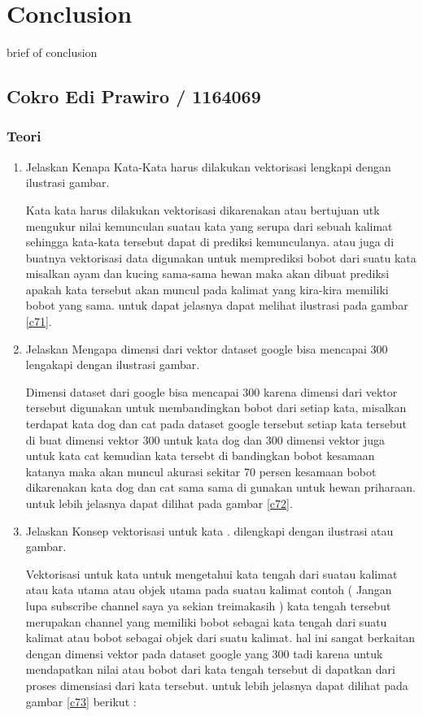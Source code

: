 \chapter{Conclusion}
brief of conclusion

\section{Cokro Edi Prawiro / 1164069}

\subsection{Teori}
\begin{enumerate}

\item Jelaskan Kenapa Kata-Kata harus dilakukan vektorisasi lengkapi dengan ilustrasi gambar.\par
Kata kata harus dilakukan vektorisasi dikarenakan atau bertujuan utk mengukur nilai kemunculan suatau kata yang serupa dari sebuah kalimat sehingga kata-kata tersebut dapat di prediksi kemunculanya. atau juga di buatnya vektorisasi data digunakan untuk memprediksi bobot dari suatu kata misalkan ayam dan kucing sama-sama hewan maka akan dibuat prediksi apakah kata tersebut akan muncul pada kalimat yang kira-kira memiliki bobot yang sama. untuk dapat jelasnya dapat melihat ilustrasi pada gambar \ref{c71}.

\item Jelaskan Mengapa dimensi dari vektor dataset google bisa mencapai 300 lengakapi dengan ilustrasi gambar. \par
Dimensi dataset dari google bisa mencapai 300 karena dimensi dari vektor tersebut digunakan untuk membandingkan bobot dari setiap kata, misalkan terdapat kata dog dan cat pada dataset google tersebut setiap kata tersebut di buat dimensi vektor 300 untuk kata dog dan 300 dimensi vektor juga untuk kata cat kemudian kata tersebt di bandingkan bobot kesamaan katanya maka akan muncul akurasi sekitar 70 persen kesamaan bobot dikarenakan kata dog dan cat sama sama di gunakan untuk hewan priharaan. untuk lebih jelasnya dapat dilihat pada gambar \ref{c72}.

\item Jelaskan Konsep vektorisasi untuk kata . dilengkapi dengan ilustrasi atau gambar. \par
Vektorisasi untuk kata untuk mengetahui kata tengah dari suatau kalimat atau kata utama atau objek utama pada suatau kalimat contoh ( Jangan lupa subscribe channel saya ya sekian treimakasih ) kata tengah tersebut merupakan channel yang memiliki bobot sebagai kata tengah dari suatu kalimat atau bobot sebagai objek dari suatu kalimat. hal ini sangat berkaitan dengan dimensi vektor pada dataset google yang 300 tadi karena untuk mendapatkan nilai atau bobot dari kata tengah tersebut di dapatkan dari proses dimensiasi dari kata tersebut. untuk lebih jelasnya dapat dilihat pada gambar \ref{c73} berikut :


\end{enumerate}
